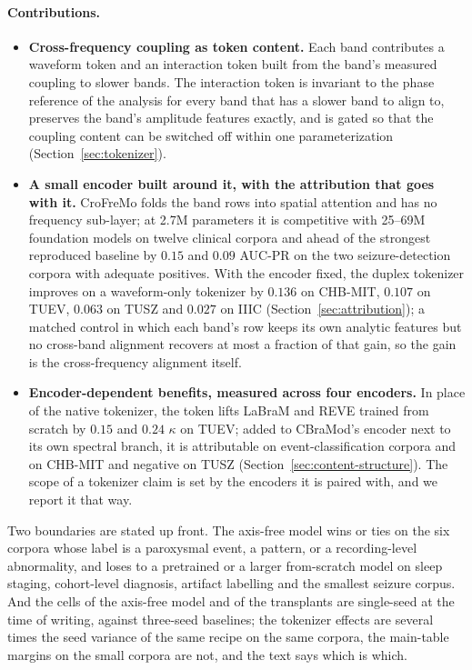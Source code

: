 \paragraph{Contributions.}
\begin{itemize}[leftmargin=*,itemsep=2pt,topsep=2pt]
\item \textbf{Cross-frequency coupling as token content.} Each band
  contributes a waveform token and an interaction token built from the
  band's measured coupling to slower bands. The interaction token is
  invariant to the phase reference of the analysis for every band that has
  a slower band to align to, preserves the band's amplitude features
  exactly, and is gated so that the coupling content can be switched off
  within one parameterization (Section~\ref{sec:tokenizer}).
\item \textbf{A small encoder built around it, with the attribution that
  goes with it.} CroFreMo folds the band rows into spatial attention and
  has no frequency sub-layer; at 2.7M parameters it is competitive with
  25--69M foundation models on twelve clinical corpora and ahead of the
  strongest reproduced baseline by $0.15$ and $0.09$ AUC-PR on the two
  seizure-detection corpora with adequate positives. With the encoder
  fixed, the duplex tokenizer improves on a waveform-only tokenizer by
  $0.136$ on CHB-MIT, $0.107$ on TUEV, $0.063$ on TUSZ and $0.027$ on IIIC
  (Section~\ref{sec:attribution}); a matched control in which each band's row keeps its own analytic
  features but no cross-band alignment recovers at most a fraction of
  that gain, so the gain is the cross-frequency alignment itself.
\item \textbf{Encoder-dependent benefits, measured across four
  encoders.} In place of the native tokenizer, the token lifts LaBraM and
  REVE trained from scratch by $0.15$ and $0.24$ $\kappa$ on TUEV; added to
  CBraMod's encoder next to its own spectral branch, it is attributable on
  event-classification corpora and on CHB-MIT and negative on TUSZ
  (Section~\ref{sec:content-structure}). The scope of a tokenizer claim is
  set by the encoders it is paired with, and we report it that way.
\end{itemize}

Two boundaries are stated up front. The axis-free model wins or ties on
the six corpora whose label is a paroxysmal event, a pattern, or a
recording-level abnormality, and loses to a pretrained or a larger
from-scratch model on sleep staging, cohort-level diagnosis, artifact
labelling and the smallest seizure corpus. And the cells of the axis-free
model and of the transplants are single-seed at the time of writing,
against three-seed baselines; the tokenizer effects are several times the
seed variance of the same recipe on the same corpora, the main-table
margins on the small corpora are not, and the text says which is which.
